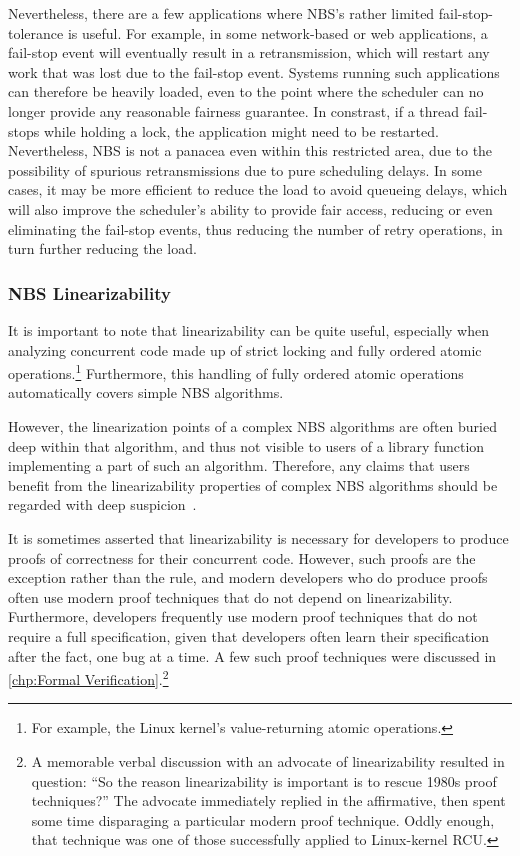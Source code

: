 Nevertheless, there are a few applications where NBS's rather limited
fail-stop-tolerance is useful.
For example, in some network-based or web applications, a fail-stop
event will eventually result in a retransmission, which will restart
any work that was lost due to the fail-stop event.
Systems running such applications can therefore be heavily loaded, even
to the point where the scheduler can no longer provide any reasonable
fairness guarantee.
In constrast, if a thread fail-stops while holding a lock, the application
might need to be restarted.
Nevertheless, NBS is not a panacea even within this restricted area,
due to the possibility of spurious retransmissions due to pure scheduling
delays.
In some cases, it may be more efficient to reduce the load to avoid
queueing delays, which will also improve the scheduler's ability to
provide fair access, reducing or even eliminating the fail-stop events,
thus reducing the number of retry operations, in turn further reducing
the load.

\subsubsection{NBS Linearizability}
\label{sec:advsync:NBS Linearizability}

It is important to note that linearizability can be quite useful,
especially when analyzing concurrent code made up of strict locking
and fully ordered atomic operations.\footnote{
	For example, the Linux kernel's value-returning atomic operations.}
Furthermore, this handling of fully ordered atomic operations
automatically covers simple NBS algorithms.

However, the linearization points of a complex NBS algorithms are often
buried deep within that algorithm, and thus not visible to users of
a library function implementing a part of such an algorithm.
Therefore, any claims that users benefit from the linearizability properties
of complex NBS algorithms should be regarded with deep
suspicion~\cite{AndreasHaas2012FIFOisnt}.

It is sometimes asserted that linearizability is necessary for developers
to produce proofs of correctness for their concurrent code.
However, such proofs are the exception rather than the rule, and modern
developers who do produce proofs often use modern proof techniques that
do not depend on linearizability.
Furthermore, developers frequently use modern proof techniques that do
not require a full specification, given that developers often learn
their specification after the fact, one bug at a time.
A few such proof techniques were discussed in
\cref{chp:Formal Verification}.\footnote{
	A memorable verbal discussion with an advocate of linearizability
	resulted in question:
	``So the reason linearizability is important is to rescue 1980s
	proof techniques?''
	The advocate immediately replied in the affirmative, then spent
	some time disparaging a particular modern proof technique.
	Oddly enough, that technique was one of those successfully
	applied to Linux-kernel RCU\@.}

